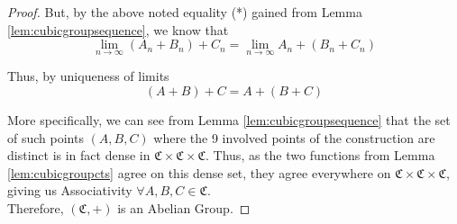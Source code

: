 \begin{proof}
But, by the above noted equality (*) gained from Lemma \ref{lem:cubicgroupsequence},
we know that 
\[
	\lim_{n \to \infty} (A_n + B_n) + C_n = \lim_{n \to \infty} A_n + (B_n + C_n) 
\]

Thus, by uniqueness of limits
\[
	(A+B)+C = A+(B+C)
\]


More specifically, we can see from Lemma \ref{lem:cubicgroupsequence} that the set of
such points $(A,B,C)$ where the 9 involved points of the construction are distinct
is in fact dense in $\mathfrak{C} \times \mathfrak{C} \times \mathfrak{C}$. Thus,
as the two functions from Lemma \ref{lem:cubicgroupcts} agree on this
dense set, they agree everywhere on $\mathfrak{C} \times \mathfrak{C} \times \mathfrak{C}$,
giving us Associativity $\forall A,B,C \in \mathfrak{C}$.\\

Therefore, $(\mathfrak{C},+)$ is an Abelian Group.
\end{proof}
